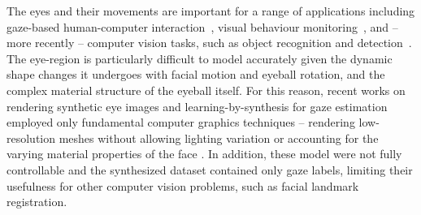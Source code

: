 The eyes and their movements are important for a range of applications including gaze-based human-computer interaction~\cite{majaranta14_apc}, visual behaviour monitoring~\cite{bulling13_chi,bulling11_pami}, and -- more recently -- computer vision tasks, such as object recognition and detection~\cite{yun2013studying,papadopoulos2014training,karthikeyan2013and}.
The eye-region is particularly difficult to model accurately given the dynamic shape changes it undergoes with facial motion and eyeball rotation, and the complex material structure of the eyeball itself.
For this reason, recent works on rendering synthetic eye images and learning-by-synthesis for gaze estimation employed only fundamental computer graphics techniques -- rendering low-resolution meshes without allowing lighting variation or accounting for the varying material properties of the face \cite{sugano2014learning,swirski2014rendering}.
In addition, these model were not fully controllable and the synthesized dataset contained only gaze labels, limiting their usefulness for other computer vision problems, such as facial landmark registration.





